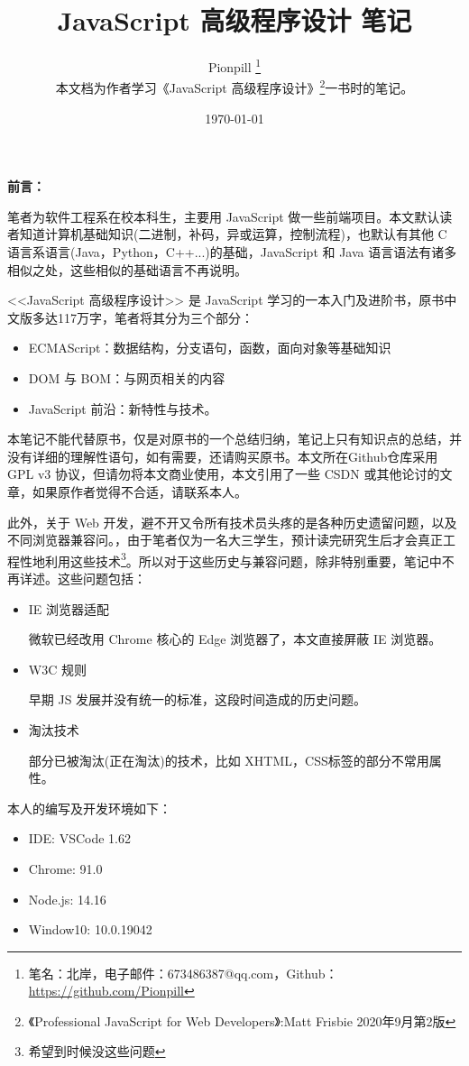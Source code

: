 \documentclass{PionpillNote-book}
\title{JavaScript 高级程序设计 笔记}
\author{
    Pionpill \footnote{笔名：北岸，电子邮件：673486387@qq.com，Github：\url{https://github.com/Pionpill}} \\
    本文档为作者学习《JavaScript 高级程序设计》\footnote{《Professional JavaScript for Web Developers》:Matt Frisbie 2020年9月第2版}一书时的笔记。\\
}
\date{\today}
\begin{document}
\pagestyle{plain}
\maketitle

\noindent\textbf{前言：}

笔者为软件工程系在校本科生，主要用 JavaScript 做一些前端项目。本文默认读者知道计算机基础知识(二进制，补码，异或运算，控制流程)，也默认有其他 C 语言系语言(Java，Python，C++...)的基础，JavaScript 和 Java 语言语法有诸多相似之处，这些相似的基础语言不再说明。

<<JavaScript 高级程序设计>> 是 JavaScript 学习的一本入门及进阶书，原书中文版多达117万字，笔者将其分为三个部分：
\begin{itemize}
    \item ECMAScript：数据结构，分支语句，函数，面向对象等基础知识
    \item DOM 与 BOM：与网页相关的内容
    \item JavaScript 前沿：新特性与技术。
\end{itemize}

本笔记不能代替原书，仅是对原书的一个总结归纳，笔记上只有知识点的总结，并没有详细的理解性语句，如有需要，还请购买原书。本文所在Github仓库采用 GPL v3 协议，但请勿将本文商业使用，本文引用了一些 CSDN 或其他论讨的文章，如果原作者觉得不合适，请联系本人。

此外，关于 Web 开发，避不开又令所有技术员头疼的是各种历史遗留问题，以及不同浏览器兼容问。，由于笔者仅为一名大三学生，预计读完研究生后才会真正工程性地利用这些技术\footnote{希望到时候没这些问题}。所以对于这些历史与兼容问题，除非特别重要，笔记中不再详述。这些问题包括：
\begin{itemize}
    \item IE 浏览器适配
    
    微软已经改用 Chrome 核心的 Edge 浏览器了，本文直接屏蔽 IE 浏览器。
    \item W3C 规则
    
    早期 JS 发展并没有统一的标准，这段时间造成的历史问题。
    \item 淘汰技术
    
    部分已被淘汰(正在淘汰)的技术，比如 XHTML，CSS标签的部分不常用属性。
\end{itemize}

本人的编写及开发环境如下：
\begin{itemize}
    \item IDE: VSCode 1.62
    \item Chrome: 91.0
    \item Node.js: 14.16
    \item Window10: 10.0.19042
\end{itemize}
\end{document}
